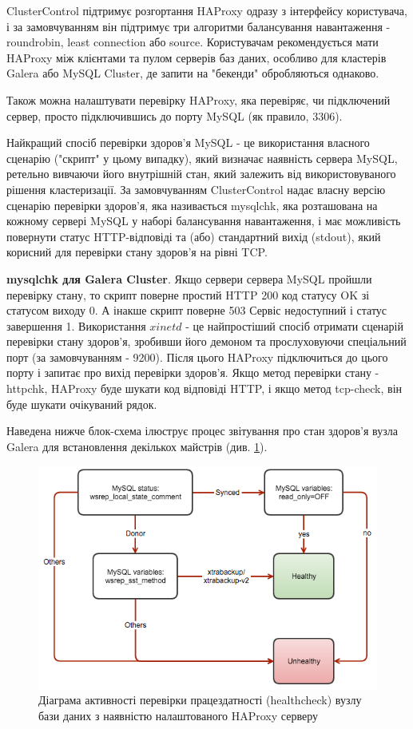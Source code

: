 \documentclass[14pt]{vakthesis}
\begin{document}
ClusterControl підтримує розгортання HAProxy одразу з інтерфейсу користувача, і за замовчуванням він підтримує три алгоритми балансування навантаження - roundrobin, least connection або source. Користувачам рекомендується мати HAProxy між клієнтами та пулом серверів баз даних, особливо для кластерів Galera або MySQL Cluster, де запити на "бекенди" обробляються однаково.

Також можна налаштувати перевірку HAProxy, яка перевіряє, чи підключений сервер, просто підключившись до порту MySQL (як правило, 3306).

Найкращий спосіб перевірки здоров'я MySQL - це використання власного сценарію ("скрипт" у цьому випадку), який визначає наявність сервера MySQL, ретельно вивчаючи його внутрішній стан, який залежить від використовуваного рішення кластеризації. За замовчуванням ClusterControl надає власну версію сценарію перевірки здоров'я, яка називається mysqlchk, яка розташована на кожному сервері MySQL у наборі балансування навантаження, і має можливість повернути статус HTTP-відповіді та (або) стандартний вихід (stdout), який корисний для перевірки стану здоров'я на рівні TCP.

\textbf{ mysqlchk для Galera Cluster}. Якщо сервери сервера MySQL пройшли перевірку стану, то скрипт поверне простий HTTP 200 код статусу OK зі статусом виходу 0. А інакше скрипт поверне 503 Сервіс недоступний і статус завершення 1.
Використання $xinetd$ - це найпростіший спосіб отримати сценарій перевірки стану здоров'я, зробивши його демоном та прослуховуючи спеціальний порт (за замовчуванням - 9200). Після цього HAProxy підключиться до цього порту і запитає про вихід перевірки здоров'я. Якщо метод перевірки стану - httpchk, HAProxy буде шукати код відповіді HTTP, і якщо метод tcp-check, він буде шукати очікуваний рядок.

Наведена нижче блок-схема ілюструє процес звітування про стан здоров'я вузла Galera для встановлення декількох майстрів (див. \ref{fig:mysqlchk}).

\begin{figure}
\centering
\includegraphics[width=\linewidth]{images/mysqlchk.png}
     \caption{Діаграма активності перевірки працездатності (healthcheck) вузлу бази даних з наявністю налаштованого HAProxy серверу}
     \label{fig:mysqlchk}
\end{figure}
\end{document}
